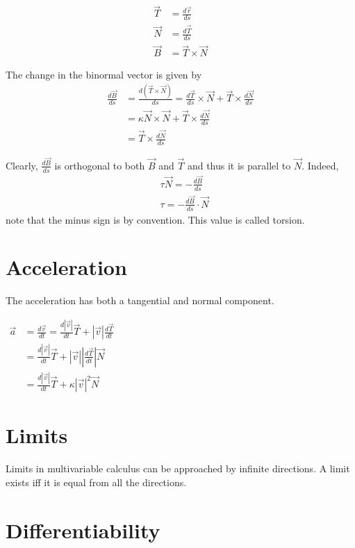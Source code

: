 \documentclass[a4paper]{article}
\begin{document}
\begin{align*}
    \vec{T} &= \frac{d\vec{r}}{ds} \\
    \vec{N} &= \frac{d\vec{T}}{ds} \\
    \vec{B} &= \vec{T} \times \vec{N}
\end{align*}

The change in the binormal vector is given by
\begin{align*}
    \frac{d\vec{B}}{ds} &= \frac{d(\vec{T} \times \vec{N})}{ds}
    = \frac{d\vec{T}}{ds} \times \vec{N} + \vec{T} \times \frac{d\vec{N}}{ds} \\
    &= \kappa\vec{N} \times \vec{N} + \vec{T} \times \frac{d\vec{N}}{ds} \\
    &= \vec{T} \times \frac{d\vec{N}}{ds}
\end{align*}

Clearly, \(\frac{d\vec{B}}{ds}\) is orthogonal to both \(\vec{B}\)
and \(\vec{T}\) and thus it is parallel to \(\vec{N}\).
Indeed,
\begin{align*}
    &\tau \vec{N} = -\frac{d\vec{B}}{ds} \\
    &\tau = -\frac{d\vec{B}}{ds} \cdot \vec{N}
\end{align*}
note that the minus sign is by convention.
This value is called torsion.

\section{Acceleration}

The acceleration has both a tangential and normal component.

$\begin{aligned} \vec{a} & =\frac{d \vec{v}}{d t}=\frac{d|\vec{v}|}{d t} \vec{T}+|\vec{v}| \frac{d \vec{T}}{d t} \\ & =\frac{d|\vec{v}|}{d t} \vec{T}+|\vec{v}|\left|\frac{d \vec{T}}{d t}\right| \vec{N} \\ & =\frac{d|\vec{v}|}{d t} \vec{T}+\kappa|\vec{v}|^2 \vec{N}\end{aligned}$

\section{Limits}

Limits in multivariable calculus can be approached by infinite directions.
A limit exists iff it is equal from all the directions.

\section{Differentiability}
\end{document}

